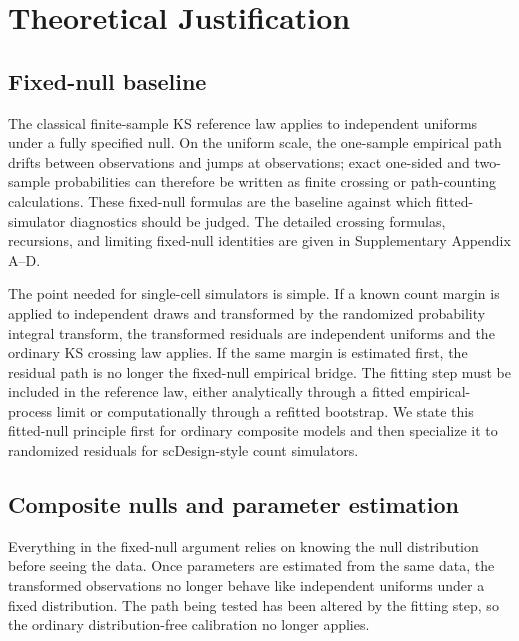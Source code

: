 \documentclass[preprint,12pt]{elsarticle}
\theoremstyle{plain}
\theoremstyle{remark}
\begin{document}
\section{Theoretical Justification}\label{sec:theory}

\subsection{Fixed-null baseline}\label{sec:fixed-null}

The classical finite-sample KS reference law applies to independent uniforms
under a fully specified null. On the uniform scale, the one-sample
empirical path drifts between observations and jumps at observations; exact
one-sided and two-sample probabilities can therefore be written as finite
crossing or path-counting calculations. These fixed-null formulas are the
baseline against which fitted-simulator diagnostics should be judged. The
detailed crossing formulas, recursions, and limiting fixed-null identities are
given in Supplementary Appendix A--D.

The point needed for single-cell simulators is simple. If a known count margin
is applied to independent draws and transformed by the randomized probability
integral transform, the transformed residuals are independent uniforms and the
ordinary KS crossing law applies. If the same margin is estimated first, the
residual path is no longer the fixed-null empirical bridge. The fitting step
must be included in the
reference law, either analytically through a fitted empirical-process limit or
computationally through a refitted bootstrap. We state this fitted-null
principle first for ordinary composite models and then specialize it to
randomized residuals for scDesign-style count simulators.

\subsection{Composite nulls and parameter estimation}
\label{sec:composite}
Everything in the fixed-null argument relies on knowing the null distribution
before seeing the data. Once parameters are estimated from the same data, the
transformed observations no longer behave like independent uniforms under a
fixed distribution. The path being tested has been altered by the fitting
step, so the ordinary distribution-free calibration no longer applies.
\end{document}
